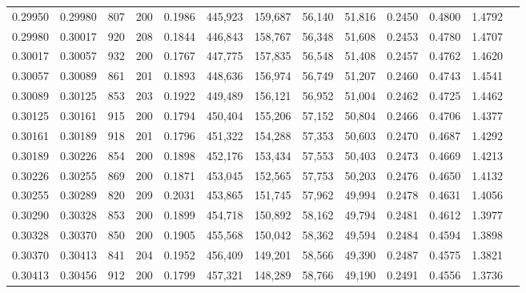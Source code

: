 \begin{tabular}{rrrrrrrrrrrrr}
0.29950 & 0.29980 &   807 & 200 &                                     0.1986 & 445,923 & 159,687 &  56,140 &  51,816 & 0.2450 & 0.4800 & 1.4792 \\
0.29980 & 0.30017 &   920 & 208 &                                     0.1844 & 446,843 & 158,767 &  56,348 &  51,608 & 0.2453 & 0.4780 & 1.4707 \\
0.30017 & 0.30057 &   932 & 200 &                                     0.1767 & 447,775 & 157,835 &  56,548 &  51,408 & 0.2457 & 0.4762 & 1.4620 \\
0.30057 & 0.30089 &   861 & 201 &                                     0.1893 & 448,636 & 156,974 &  56,749 &  51,207 & 0.2460 & 0.4743 & 1.4541 \\
0.30089 & 0.30125 &   853 & 203 &                                     0.1922 & 449,489 & 156,121 &  56,952 &  51,004 & 0.2462 & 0.4725 & 1.4462 \\
0.30125 & 0.30161 &   915 & 200 &                                     0.1794 & 450,404 & 155,206 &  57,152 &  50,804 & 0.2466 & 0.4706 & 1.4377 \\
0.30161 & 0.30189 &   918 & 201 &                                     0.1796 & 451,322 & 154,288 &  57,353 &  50,603 & 0.2470 & 0.4687 & 1.4292 \\
0.30189 & 0.30226 &   854 & 200 &                                     0.1898 & 452,176 & 153,434 &  57,553 &  50,403 & 0.2473 & 0.4669 & 1.4213 \\
0.30226 & 0.30255 &   869 & 200 &                                     0.1871 & 453,045 & 152,565 &  57,753 &  50,203 & 0.2476 & 0.4650 & 1.4132 \\
0.30255 & 0.30289 &   820 & 209 &                                     0.2031 & 453,865 & 151,745 &  57,962 &  49,994 & 0.2478 & 0.4631 & 1.4056 \\
0.30290 & 0.30328 &   853 & 200 &                                     0.1899 & 454,718 & 150,892 &  58,162 &  49,794 & 0.2481 & 0.4612 & 1.3977 \\
0.30328 & 0.30370 &   850 & 200 &                                     0.1905 & 455,568 & 150,042 &  58,362 &  49,594 & 0.2484 & 0.4594 & 1.3898 \\
0.30370 & 0.30413 &   841 & 204 &                                     0.1952 & 456,409 & 149,201 &  58,566 &  49,390 & 0.2487 & 0.4575 & 1.3821 \\
0.30413 & 0.30456 &   912 & 200 &                                     0.1799 & 457,321 & 148,289 &  58,766 &  49,190 & 0.2491 & 0.4556 & 1.3736 \\

\end{tabular}
